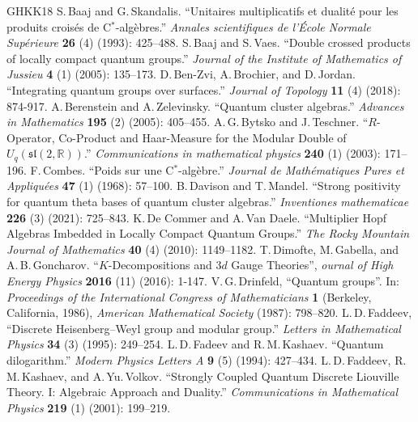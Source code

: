 \documentclass[11pt, reqno]{amsart}
\theoremstyle{definition}
\numberwithin{equation}{section}
\def\R{\mathbb R}
\begin{document}
\begin{thebibliography}{GHKK18}
 S.\,Baaj and G.\,Skandalis. ``Unitaires multiplicatifs et dualit\'{e} pour les produits crois\'{e}s de C$^*$-alg\`{e}bres.'' \emph{Annales scientifiques de l'\'Ecole Normale Sup\'erieure} \textbf{26} (4) (1993): 425--488.
 S.\,Baaj and S.\,Vaes. ``Double crossed products of locally compact quantum groups.'' \emph{Journal of the Institute of Mathematics of Jussieu} \textbf{4} (1) (2005): 135--173.
D.\,Ben-Zvi, A.\,Brochier, and D.\,Jordan.
``Integrating quantum groups over surfaces.''
\emph{Journal of Topology} \textbf{11} (4) (2018): 874-917.
 A.\,Berenstein and A.\,Zelevinsky. ``Quantum cluster algebras.'' \emph{Advances in Mathematics} \textbf{195} (2) (2005): 405--455.
 A.\,G.\,Bytsko and J.\,Teschner. ``$R$-Operator, Co-Product and Haar-Measure for the Modular Double of $U_q(\mathfrak{sl}(2,\R))$.'' \emph{Communications in mathematical physics} \textbf{240} (1) (2003): 171--196.
 F.\,Combes. ``Poids sur une C$^*$-alg\`{e}bre.'' \emph{Journal de Math\'ematiques Pures et Appliqu\'ees} \textbf{47} (1) (1968): 57--100.
 B.\,Davison and T.\,Mandel.
``Strong positivity for quantum theta bases of quantum cluster algebras.'' \emph{Inventiones mathematicae} \textbf{226} (3) (2021): 725--843.
 K.\,De Commer and A.\,Van Daele. ``Multiplier Hopf Algebras Imbedded in Locally Compact Quantum Groups.'' \emph{The Rocky Mountain Journal of Mathematics} 
\textbf{40} (4) (2010): 1149--1182.
 T.\,Dimofte, M.\,Gabella, and A.\,B.\,Goncharov. ``$K$-Decompositions and $3d$ Gauge Theories'', \emph{ournal of High Energy Physics} \textbf{2016} (11) (2016): 1-147.
 V.\,G.\,Drinfeld, ``Quantum groups''. In: \emph{Proceedings of the International Congress of Mathematicians} \textbf{1} (Berkeley,
California, 1986), \emph{American Mathematical Society} (1987): 798--820.
 L.\,D.\,Faddeev, ``Discrete Heisenberg--Weyl group and modular group.'' \emph{Letters in Mathematical Physics} \textbf{34} (3) (1995): 249--254.
 L.\,D.\,Fadeev and R.\,M.\,Kashaev. ``Quantum dilogarithm.'' \emph{Modern Physics Letters A} \textbf{9} (5) (1994): 427--434.
  L.\,D.\,Faddeev, R.\,M.\,Kashaev, and A.\,Yu.\,Volkov. ``Strongly Coupled Quantum Discrete Liouville Theory. I: Algebraic Approach and Duality.'' \emph{Communications in Mathematical Physics} \textbf{219} (1) (2001): 199--219.

\end{thebibliography}
\end{document}
